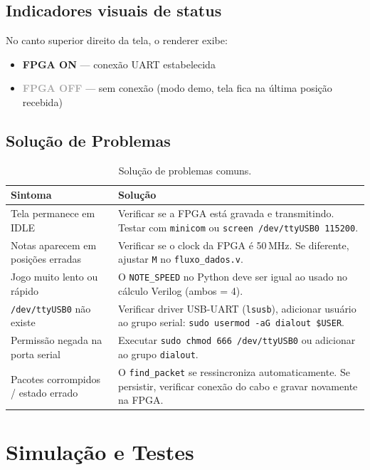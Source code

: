 \documentclass[12pt,a4paper]{article}
\begin{document}
\subsection{Indicadores visuais de status}

No canto superior direito da tela, o renderer exibe:
\begin{itemize}
    \item \textcolor{pygreen}{\textbf{FPGA ON}} — conexão UART estabelecida
    \item \textcolor{darkgray}{\textbf{FPGA OFF}} — sem conexão (modo demo, tela fica na última posição recebida)
\end{itemize}

\subsection{Solução de Problemas}

\begin{table}[H]
\centering
\begin{tabularx}{\textwidth}{lX}
\toprule
\textbf{Sintoma} & \textbf{Solução} \\
\midrule
Tela permanece em IDLE &
  Verificar se a FPGA está gravada e transmitindo. Testar com \texttt{minicom} ou \texttt{screen /dev/ttyUSB0 115200}. \\[6pt]
Notas aparecem em posições erradas &
  Verificar se o clock da FPGA é 50\,MHz. Se diferente, ajustar \texttt{M} no \texttt{fluxo\_dados.v}. \\[6pt]
Jogo muito lento ou rápido &
  O \texttt{NOTE\_SPEED} no Python deve ser igual ao usado no cálculo Verilog (ambos = 4). \\[6pt]
\texttt{/dev/ttyUSB0} não existe &
  Verificar driver USB-UART (\texttt{lsusb}), adicionar usuário ao grupo serial: \texttt{sudo usermod -aG dialout \$USER}. \\[6pt]
Permissão negada na porta serial &
  Executar \texttt{sudo chmod 666 /dev/ttyUSB0} ou adicionar ao grupo \texttt{dialout}. \\[6pt]
Pacotes corrompidos / estado errado &
  O \texttt{find\_packet} se ressincroniza automaticamente. Se persistir, verificar conexão do cabo e gravar novamente na FPGA. \\
\bottomrule
\end{tabularx}
\caption{Solução de problemas comuns.}
\end{table}

\section{Simulação e Testes}
\end{document}
